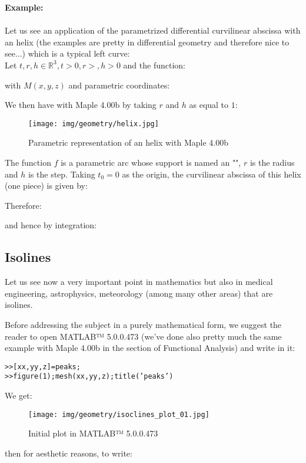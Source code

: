 {	\begin{tcolorbox}[colframe=black,colback=white,sharp corners]
	\textbf{{\Large {}}Example:}\\\\
	\label{curvilinear abscissa helix}Let us see an application of the parametrized differential curvilinear abscissa with an helix (the examples are pretty in differential geometry and therefore nice to see...) which is a typical left curve:\\
	
	Let $t,r,h\in \mathbb{R}^3,t>0,r>,h>0$ and the function:
	
	with $M(x,y,z)$ and parametric coordinates:
	
	We then have with Maple 4.00b by taking $r$ and $h$ as equal to $1$:
	\begin{figure}[H]
		\centering
		\texttt{[image: img/geometry/helix.jpg]}
		\caption{Parametric representation of an helix with Maple 4.00b}
	\end{figure}
	The function $f$ is a parametric arc whose support is named an "", $r$ is the radius and $h$ is the step. Taking $t_0=0$ as the origin, the curvilinear abscissa of this helix (one piece) is given by:
	
	Therefore:
	
	and hence by integration:
	
	\end{tcolorbox}
	
	\subsection{Isolines}\label{isoline}
	Let us see now  a very important point in mathematics but also in medical engineering, astrophysics, meteorology (among many other areas) that are isolines.
	
	Before addressing the subject in a purely mathematical form, we suggest the reader to open MATLAB™ 5.0.0.473 (we've done also pretty much the same example with Maple 4.00b in the section of Functional Analysis) and write in it:
	
	\texttt{>>[xx,yy,z]=peaks;\\
	>>figure(1);mesh(xx,yy,z);title('peaks')}
	
	We get:
	\begin{figure}[H]
		\centering
		\texttt{[image: img/geometry/isoclines\_plot\_01.jpg]}
		\caption[]{Initial plot in MATLAB™ 5.0.0.473}
	\end{figure}
	then for aesthetic reasons, to write:
	
}
